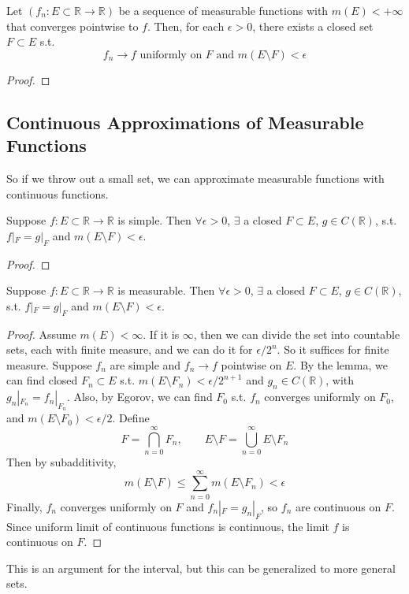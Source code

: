   \begin{theorem}[Egorov]
    Let $(f_n: E \subset \mathbb{R} \to \mathbb{R})$ be a sequence of measurable functions with $m(E) < +\infty$ that converges pointwise to $f$. Then, for each $\epsilon > 0$, there exists a closed set $F \subset E$  s.t. 
    \begin{equation}
      f_n \to f \text{ uniformly on } F \text{ and } m(E \setminus F) < \epsilon
    \end{equation}
  \end{theorem}
  \begin{proof}
    
  \end{proof}

\subsection{Continuous Approximations of Measurable Functions}

  So if we throw out a small set, we can approximate measurable functions with continuous functions. 

  \begin{lemma}
    Suppose $f: E \subset \mathbb{R} \to \mathbb{R}$ is simple. Then $\forall \epsilon > 0$, $\exists$ a closed $F \subset E$, $g \in C(\mathbb{R})$, s.t. $f|_F = g |_F$ and $m(E \setminus F) < \epsilon$. 
  \end{lemma}
  \begin{proof}
    
  \end{proof}

  \begin{theorem}[Luzin]
    Suppose $f: E \subset \mathbb{R} \to \mathbb{R}$ is measurable. Then $\forall \epsilon > 0$, $\exists$ a closed $F \subset E$, $g \in C(\mathbb{R})$, s.t. $f|_F = g |_F$ and $m(E \setminus F) < \epsilon$. 
  \end{theorem}
  \begin{proof}
    Assume $m(E) < \infty$. If it is $\infty$, then we can divide the set into countable sets, each with finite measure, and we can do it for $\epsilon/2^{n}$. So it suffices for finite measure. Suppose $f_n$ are simple and $f_n \to f$ pointwise on $E$. By the lemma, we can find closed $F_n \subset E$ s.t. $m(E \setminus F_n) < \epsilon / 2^{n+1}$ and $g_n \in C(\mathbb{R})$, with $g_n |_{F_n} = f_n |_{F_n}$. Also, by Egorov, we can find $F_0$ s.t. $f_n$ converges uniformly on $F_0$, and $m(E \setminus F_0) < \epsilon / 2$. Define 
    \begin{equation}
      F = \bigcap_{n=0}^\infty F_n, \qquad E \setminus F = \bigcup_{n=0}^\infty E \setminus F_n
    \end{equation}
    Then by subadditivity,
    \begin{equation}
      m(E \setminus F) \leq \sum_{n=0}^\infty m(E \setminus F_n) < \epsilon
    \end{equation}
    Finally, $f_n$ converges uniformly on $F$ and $f_n |_F = g_n |_F$, so $f_n$ are continuous on $F$. Since uniform limit of continuous functions is continuous, the limit $f$ is continuous on $F$. 
  \end{proof}

  This is an argument for the interval, but this can be generalized to more general sets. 

